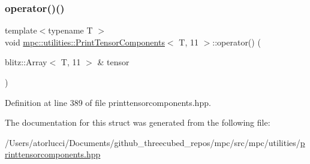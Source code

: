 \subsubsection{\texorpdfstring{operator()()}{operator()()}}
{\footnotesize\ttfamily template$<$typename T $>$ \\
void \mbox{\hyperlink{structmpc_1_1utilities_1_1_print_tensor_components}{mpc\+::utilities\+::\+Print\+Tensor\+Components}}$<$ T, 11 $>$\+::operator() (\begin{DoxyParamCaption}\item[{blitz\+::\+Array$<$ T, 11 $>$ \&}]{tensor }\end{DoxyParamCaption})\hspace{0.3cm}{\ttfamily [inline]}}



Definition at line 389 of file printtensorcomponents.\+hpp.



The documentation for this struct was generated from the following file\+:\begin{DoxyCompactItemize}
\item 
/\+Users/atorlucci/\+Documents/github\+\_\+threecubed\+\_\+repos/mpc/src/mpc/utilities/\mbox{\hyperlink{printtensorcomponents_8hpp}{printtensorcomponents.\+hpp}}\end{DoxyCompactItemize}
